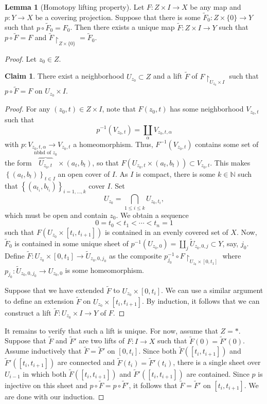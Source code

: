 \documentclass[10pt,letterpaper,cm]{nupset}
\theoremstyle{definition}
\theoremstyle{theorem}
\newtheorem{lemma}[definition]{Lemma}
\newtheorem*{claim}{Claim}
\theoremstyle{remark}
\newcommand{\N}{\mathbb N}
\newcommand{\1}{\mathbb{1}}
\newcommand{\0}{\vec 0}
\begin{document}
\begin{lemma}[Homotopy lifting property]\label{HLP}
Let $F : Z \times I \to X$ be any map and $p: Y \to X$ be a covering projection. Suppose that there is some $\widetilde{F}_0 : Z \times \{0\} \to Y$ such that $p \circ \widetilde{F}_0 = F_0$. Then there exists a unique map $\widetilde{F} : Z \times I \to Y$ such that $p \circ \widetilde{F} = F$ and $\widetilde{F} \restriction_{Z\times \{0\}} = \widetilde{F}_0$.
\end{lemma}
\begin{proof}
Let $z_0\in Z$.
\begin{claim} There exist a neighborhood $U_{z_0}\subset Z$ and a lift $\widetilde{F}$ of $F\restriction_{U_{z_0}\times I}$ such that $p \circ \widetilde{F} = F$ on $U_{z_0}\times I$.
\end{claim}
\begin{proof}
For any $(z_0, t) \in Z \times I$, note that $F(z_0, t)$ has some neighborhood $V_{z_0,t}$ such that $$p^{-1}(V_{z_0, t}) = \coprod_{\alpha} V_{z_0,t, \alpha}$$ with $p: V_{z_0, t, \alpha} \to V_{z_0, t}$ a homeomorphism. Thus, $F^{-1}(V_{z_0, t})$ contains some set of the form $\overbrace{U_{z_0, t}}^{\text{nbhd of } z_0} \times \left(a_t, b_t\right)$, so that $F(U_{z_0, t}  \times (a_t, b_t)) \subset V_{z_0, t} $. This makes $\left\{\left(a_t, b_t\right)\right\}_{t\in I}$ an open cover of $I$. As $I$ is compact, there is some $k\in \N$ such that $\left\{(a_{t_i}, b_{t_i})\right\}_{i=1, \ldots, k}$  cover $I$. Set $$U_{z_0} = \bigcap_{1\leq i \leq k} U_{z_0, t_i},$$ which must be  open and contain $z_0$. We obtain a sequence $$ 0= t_0 < t_1 < \cdots < t_n =1 $$ such that $F(U_{z_0} \times [t_i, t_{i+1}])$ is contained in an evenly covered set of $X$. 
Now, $\widetilde{F}_0 $ is contained in some unique sheet of $p^{-1}(U_{z_0, 0}) =\coprod_j \widetilde{U}_{z_0, 0, j} \subset Y$, say, $j_0$. Define $\widetilde{F} : U_{z_0} \times [0, t_1] \to \widetilde{U}_{z_0, 0, j_0}$ as the composite $p^{-1}_{j_0} \circ F \restriction_{U_{z_0} \times [0, t_1]}$ where $p_{j_0} : \widetilde{U}_{z_0, 0, j_0} \to U_{z_0, 0}$ is some homeomorphism.

\medskip

 Suppose that we have extended $\widetilde{F}$ to $U_{z_0} \times [0,t_i]$. We can use a similar argument to define an extension $\widetilde{F}$ on $U_{z_0} \times [t_i, t_{i+1}]$.  By induction, it follows that we can construct a lift $\tilde{F} : U_{z_0} \times I \to Y$ of $F$.
\end{proof}
 It remains to verify that such a lift is unique. For now, assume that $Z= \ast$. Suppose that $\widetilde{F}$ and $\widetilde{F}'$ are two lifts of $F: I \to X$ such that $\widetilde{F}(0) = \widetilde{F}'(0)$. Assume inductively that $\widetilde{F} = \widetilde{F}'$ on $[0,t_i]$. Since both $\widetilde{F}([t_i, t_{i+1}])$ and $\widetilde{F}'([t_i, t_{i+1}])$ are connected and $\widetilde{F}(t_i) = \widetilde{F}'(t_i)$, there is a single sheet over $U_{i-1}$ in which both $\widetilde{F}([t_i, t_{i+1}])$ and $\widetilde{F}'([t_i, t_{i+1}])$ are contained. Since $p$ is injective on this sheet and $p\circ \widetilde{F} = p \circ \widetilde{F}'$, it follows that $\widetilde{F} = \widetilde{F}'$ on $[t_i, t_{i+1}]$. We are done with our induction.



\end{proof}
\end{document}
